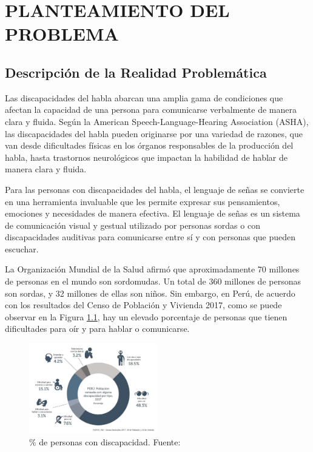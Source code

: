 \chapter{PLANTEAMIENTO DEL PROBLEMA}
\section{Descripción de la Realidad Problemática}

Las discapacidades del habla abarcan una amplia gama de condiciones que afectan la capacidad de una persona para comunicarse verbalmente de manera clara y fluida. Según la American Speech-Language-Hearing Association (ASHA), las discapacidades del habla pueden originarse por una variedad de razones, que van desde dificultades físicas en los órganos responsables de la producción del habla, hasta trastornos neurológicos que impactan la habilidad de hablar de manera clara y fluida.

Para las personas con discapacidades del habla, el lenguaje de señas se convierte en una herramienta invaluable que les permite expresar sus pensamientos, emociones y necesidades de manera efectiva. El lenguaje de señas es un sistema de comunicación visual y gestual utilizado por personas sordas o con discapacidades auditivas para comunicarse entre sí y con personas que pueden escuchar.

La Organización Mundial de la Salud afirmó que aproximadamente 70 millones de personas en el mundo son sordomudas. Un total de 360 millones de personas son sordas, y 32 millones de ellas son niños. Sin embargo, en Perú, de acuerdo con los resultados del Censo de Población y Vivienda 2017, como se puede observar en la Figura \ref{1:fig 1}, hay un elevado porcentaje de personas que tienen dificultades para oír y para hablar o comunicarse.

\begin{figure}[h]
	\begin{center}
		\includegraphics[width=0.5\textwidth]{1/figures/personas_discapacidad.jpg}
		\caption{\% de personas con discapacidad. Fuente: \cite{porcentaje de_personas_discapacidad}}
		\label{1:fig 1}
	\end{center}
\end{figure}


